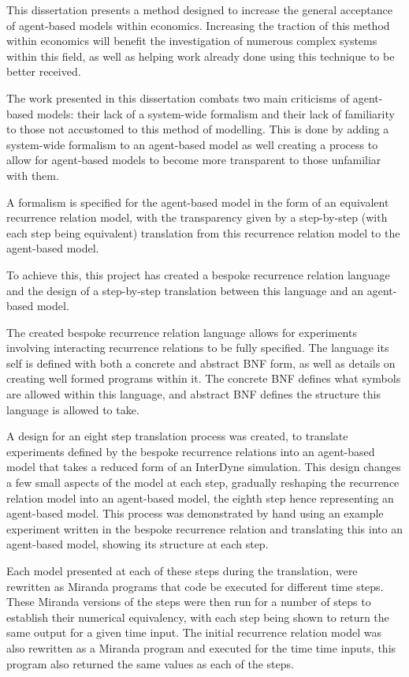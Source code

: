\documentclass{article}
\begin{document}
This dissertation presents a method designed to increase the general acceptance of agent-based models within economics. Increasing the traction of this method within economics will benefit the investigation of numerous complex systems within this field, as well as helping work already done using this technique to be better received. 

The work presented in this dissertation combats two main criticisms of agent-based models: their lack of a system-wide formalism and their lack of familiarity to those not accustomed to this method of modelling. This is done by adding a system-wide formalism to an agent-based model as well creating a process to allow for agent-based models to become more transparent to those unfamiliar with them.

A formalism is specified for the agent-based model in the form of an equivalent recurrence relation model, with the transparency given by a step-by-step (with each step being equivalent) translation from this recurrence relation model to the agent-based model. 

To achieve this, this project has created a bespoke recurrence relation language and the design of a step-by-step translation between this language and an agent-based model.  

The created bespoke recurrence relation language allows for experiments involving interacting recurrence relations to be fully specified. The language its self is defined with both a concrete and abstract BNF form, as well as details on creating well formed programs within it. The concrete BNF defines what symbols are allowed within this language, and abstract BNF defines the structure this language is allowed to take.   

A design for an eight step translation process was created, to translate experiments defined by the bespoke recurrence relations into an agent-based model that takes a reduced form of an InterDyne simulation. This design changes a few small aspects of the model at each step, gradually reshaping the recurrence relation model into an agent-based model, the eighth step hence representing an agent-based model. This process was demonstrated by hand using an example experiment written in the bespoke recurrence relation and translating this into an agent-based model, showing its structure at each step. 

Each model presented at each of these steps during the translation, were rewritten as Miranda programs that code be executed for different time steps. These Miranda versions of the steps were then run for a number of steps to establish their numerical equivalency, with each step being shown to return the same output for a given time input. The initial recurrence relation model was also rewritten as a Miranda program and executed for the time time inputs, this program also returned the same values as each of the steps.  
\end{document}
